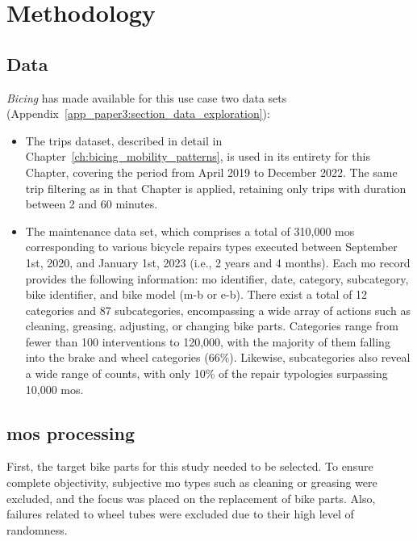\section{Methodology}
\label{sec:failure_forecasting_methodology}

    \subsection{Data}

\textit{Bicing} has made available for this use case two data sets (Appendix~\ref{app_paper3:section_data_exploration}):

\begin{itemize}
    \item The trips dataset, described in detail in Chapter~\ref{ch:bicing_mobility_patterns}, is used in its entirety for this Chapter, covering the period from April 2019 to December 2022. The same trip filtering as in that Chapter is applied, retaining only trips with duration between 2 and 60 minutes.

    \item The maintenance data set, which comprises a total of 310,000 \acp{mo} corresponding to various bicycle repairs types executed between September 1st, 2020, and January 1st, 2023 (i.e., 2 years and 4 months). Each \ac{mo} record provides the following information: \ac{mo} identifier, date, category, subcategory, bike identifier, and bike model (\ac{m-b} or \ac{e-b}).
    There exist a total of 12 categories and 87 subcategories, encompassing a wide array of actions such as cleaning, greasing, adjusting, or changing bike parts. Categories range from fewer than 100 interventions to 120,000, with the majority of them falling into the brake and wheel categories (66\%). Likewise, subcategories also reveal a wide range of counts, with only 10\% of the repair typologies surpassing 10,000 \acp{mo}.
  \end{itemize}

    \subsection[MOs processing]{\acp{mo} processing} 
    \label{section_mos_processing}

First, the target bike parts for this study needed to be selected. To ensure complete objectivity, subjective \ac{mo} types such as cleaning or greasing were excluded, and the focus was placed on the replacement of bike parts. Also, failures related to wheel tubes were excluded due to their high level of randomness.

